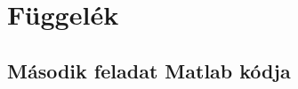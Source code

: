 \appendix
\chapter*{Függelék}
\setcounter{chapter}{6}  %

\setcounter{figure}{0} 


\section*{Második feladat Matlab kódja}
\label{MatlabCode}